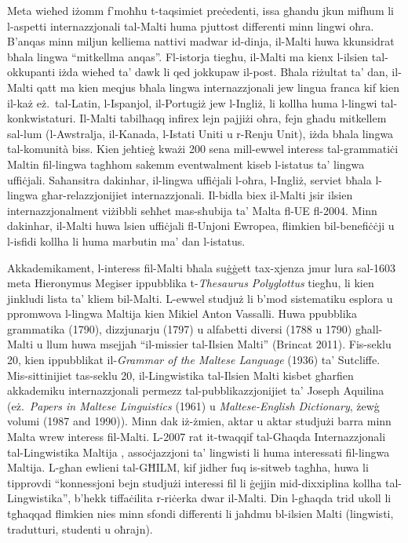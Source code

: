 \begin{multicols}{2}
Meta wieħed iżomm f’moħħu t-taqsimiet preċedenti, issa għandu jkun mifhum li l-aspetti internazzjonali tal-Malti huma pjuttost differenti minn lingwi oħra. B’anqas minn miljun kelliema nattivi madwar id-dinja, il-Malti huwa kkunsidrat bħala lingwa ``mitkellma anqas''. Fl-istorja tiegħu, il-Malti ma kienx l-ilsien tal-okkupanti iżda wieħed ta’ dawk li qed jokkupaw il-post. Bħala riżultat ta’ dan, il-Malti qatt ma kien meqjus bħala lingwa internazzjonali jew lingua franca kif kien il-każ eż.~tal-Latin, l-Ispanjol, il-Portugiż jew l-Ingliż, li kollha huma l-lingwi tal-konkwistaturi. Il-Malti tabilħaqq infirex lejn pajjiżi oħra, fejn għadu mitkellem sal-lum (l-Awstralja, il-Kanada, l-Istati Uniti u r-Renju Unit), iżda bħala lingwa tal-komunità biss. Kien jeħtieġ kważi 200 sena mill-ewwel interess tal-grammatiċi Maltin fil-lingwa tagħhom sakemm eventwalment kiseb l-istatus ta’ lingwa uffiċjali. Saħansitra dakinhar, il-lingwa uffiċjali l-oħra, l-Ingliż, serviet bħala l-lingwa għar-relazzjonijiet internazzjonali.
Il-bidla biex il-Malti jsir ilsien internazzjonalment viżibbli seħħet mas-sħubija ta’ Malta fl-UE fl-2004. Minn dakinhar, il-Malti huwa lsien uffiċjali fl-Unjoni Ewropea, flimkien bil-benefiċċji u l-isfidi kollha li huma marbutin ma’ dan l-istatus.

Akkademikament, l-interess fil-Malti bħala suġġett tax-xjenza jmur lura sal-1603 meta Hieronymus Megiser ippubblika t-\emph{Thesaurus Polyglottus} tiegħu, li kien jinkludi lista ta’ kliem bil-Malti. L-ewwel studjuż li b’mod sistematiku esplora u ppromwova l-lingwa Maltija kien Mikiel Anton Vassalli. Huwa ppubblika grammatika (1790), dizzjunarju (1797) u alfabetti diversi (1788 u 1790) għall-Malti u llum huwa msejjaħ ``il-missier tal-Ilsien Malti'' (Brincat 2011). Fis-seklu 20, kien ippubblikat il-\emph{Grammar of the Maltese Language} (1936) ta’ Sutcliffe. Mis-sittinijiet tas-seklu 20, il-Lingwistika tal-Ilsien Malti kisbet għarfien akkademiku internazzjonali permezz tal-pubblikazzjonijiet ta’ Joseph Aquilina (eż.~\emph{Papers in Maltese Linguistics} (1961) u \emph{Maltese-English Dictionary}, żewġ volumi (1987 and 1990)).  Minn dak iż-żmien, aktar u aktar studjużi barra minn Malta wrew interess fil-Malti. L-2007 rat it-twaqqif tal-Għaqda Internazzjonali tal-Lingwistika Maltija \cite{GHILM2}, assoċjazzjoni ta’ lingwisti li huma interessati fil-lingwa Maltija. L-għan ewlieni tal-GĦILM, kif jidher fuq is-sitweb tagħha, huwa li tipprovdi ``konnessjoni bejn studjużi interessi fil li ġejjin mid-dixxiplina kollha tal-Lingwistika'', b'hekk tiffaċilita r-riċerka dwar il-Malti. Din l-għaqda trid ukoll li tgħaqqad flimkien nies minn sfondi differenti li jaħdmu bl-ilsien Malti (lingwisti, tradutturi, studenti u oħrajn).


\end{multicols}
